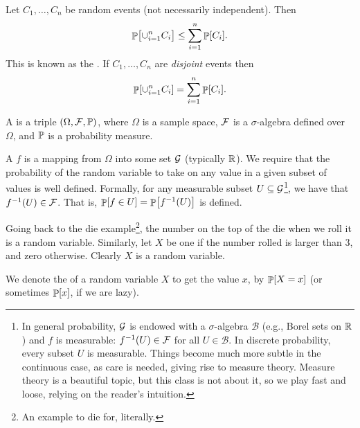 \begin{observation}
    Let $C_1, \ldots, C_n$ be random events (not necessarily
    independent). Then
    \begin{align*}
      \Prob{\bigl. \smash{\cup_{i=1}^{n} C_i} } \leq \sum_{i=1}^{n} \Prob{C_i}.
    \end{align*}
    This is known as the .  If $C_1, \ldots, C_n$ are
    \emph{disjoint} events then
    \begin{align*}
      \Prob{\cup_{i=1}^{n} C_i} = \sum_{i=1}^{n} \Prob{C_i}.
    \end{align*}
\end{observation}


\begin{defn}
    A  is a triple $(\Omega, \mathcal{F},
    \mathbb{P})$, where $\Omega$ is a sample space, $\mathcal{F}$ is a
    $\sigma$-algebra defined over $\Omega$, and $\mathbb{P}$ is a
    probability measure.
\end{defn}

\begin{defn}
    A  $f$ is a mapping from $\Omega$ into some set
    $\mathcal{G}$ (typically $\mathbb{R}$). We require that the probability of
    the random variable to take on any value in a given subset of values
    is well defined. Formally, for any measurable subset
    $U \subseteq \mathcal{G}$\footnote{%
       In general probability, $\mathcal{G}$ is endowed with a
       $\sigma$-algebra $\mathcal{B}$ (e.g., Borel sets on $\mathbb{R}$) and
       $f$ is measurable: $f^{-1}(U) \in \mathcal{F}$ for all
       $U \in \mathcal{B}$. In discrete probability, every subset $U$ is
       measurable. Things become much more subtle in the continuous case,
       as care is needed, giving rise to measure theory. Measure theory
       is a beautiful topic, but this class is not about it, so we play
       fast and loose, relying on the reader's intuition.%
    }, we have that $f^{-1} \pth{U} \in \Family$. That is,
    $\Prob{ f \in U} = \Prob{ f^{-1}\pth{U}}$ is defined.
\end{defn}

Going back to the die example\footnote{An example to die for,
   literally.}, the number on the top of the die when we roll it is a
random variable. Similarly, let $X$ be one if the number rolled is larger
than $3$, and zero otherwise. Clearly $X$ is a random variable.

We denote the  of a random variable $X$ to get the
value $x$, by $\Prob{X=x}$ (or sometimes $\Prob{x}$, if we are lazy).







